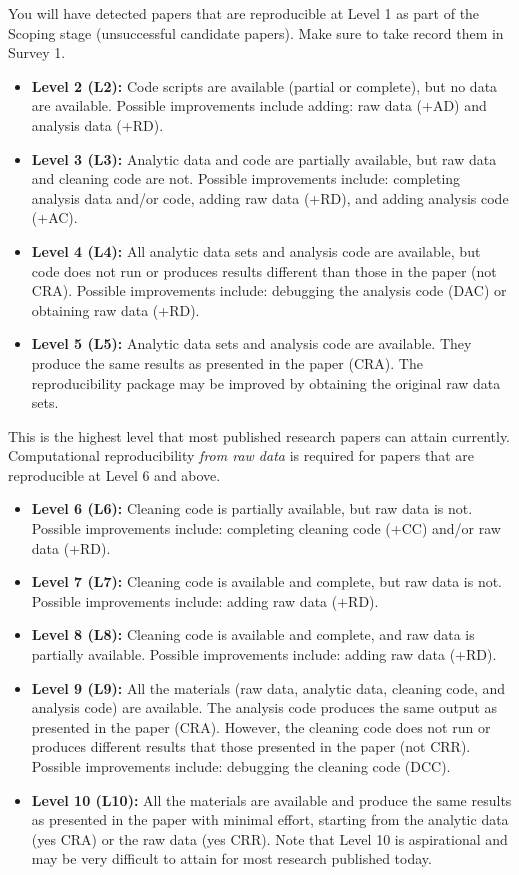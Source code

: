 \documentclass[]{book}
\begin{document}
You will have detected papers that are reproducible at Level 1 as part of the Scoping stage (unsuccessful candidate papers). Make sure to take record them in Survey 1.

\begin{itemize}
\item
  \textbf{Level 2 (L2):} Code scripts are available (partial or complete), but no data are available. Possible improvements include adding: raw data (+AD) and analysis data (+RD).
\item
  \textbf{Level 3 (L3):} Analytic data and code are partially available, but raw data and cleaning code are not. Possible improvements include: completing analysis data and/or code, adding raw data (+RD), and adding analysis code (+AC).
\item
  \textbf{Level 4 (L4):} All analytic data sets and analysis code are available, but code does not run or produces results different than those in the paper (not CRA). Possible improvements include: debugging the analysis code (DAC) or obtaining raw data (+RD).
\item
  \textbf{Level 5 (L5):} Analytic data sets and analysis code are available. They produce the same results as presented in the paper (CRA). The reproducibility package may be improved by obtaining the original raw data sets.
\end{itemize}

This is the highest level that most published research papers can attain currently. Computational reproducibility \emph{from raw data} is required for papers that are reproducible at Level 6 and above.

\begin{itemize}
\item
  \textbf{Level 6 (L6):} Cleaning code is partially available, but raw data is not. Possible improvements include: completing cleaning code (+CC) and/or raw data (+RD).
\item
  \textbf{Level 7 (L7):} Cleaning code is available and complete, but raw data is not. Possible improvements include: adding raw data (+RD).
\item
  \textbf{Level 8 (L8):} Cleaning code is available and complete, and raw data is partially available. Possible improvements include: adding raw data (+RD).
\item
  \textbf{Level 9 (L9):} All the materials (raw data, analytic data, cleaning code, and analysis code) are available. The analysis code produces the same output as presented in the paper (CRA). However, the cleaning code does not run or produces different results that those presented in the paper (not CRR). Possible improvements include: debugging the cleaning code (DCC).
\item
  \textbf{Level 10 (L10):} All the materials are available and produce the same results as presented in the paper with minimal effort, starting from the analytic data (yes CRA) or the raw data (yes CRR). Note that Level 10 is aspirational and may be very difficult to attain for most research published today.
\end{itemize}
\end{document}
